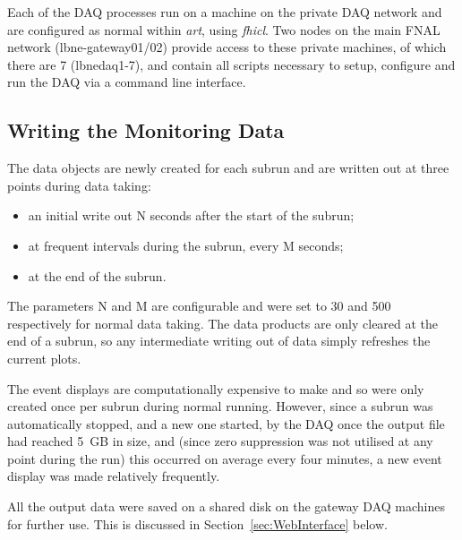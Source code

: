 Each of the DAQ processes run on a machine on the private DAQ network and are configured as normal within \textit{art}, using \textit{fhicl}.  Two nodes on the main FNAL network (lbne-gateway01/02) provide access to these private machines, of which there are 7 (lbnedaq1-7), and contain all scripts necessary to setup, configure and run the DAQ via a command line interface.

\subsection{Writing the Monitoring Data}\label{sec:WritingMonitoringData}

The data objects are newly created for each subrun and are written out at three points during data taking:
\begin{itemize}
\item an initial write out N seconds after the start of the subrun;
\item at frequent intervals during the subrun, every M seconds;
\item at the end of the subrun.
\end{itemize}
The parameters N and M are configurable and were set to 30 and 500 respectively for normal data taking.  The data products are only cleared at the end of a subrun, so any intermediate writing out of data simply refreshes the current plots.

The event displays are computationally expensive to make and so were only created once per subrun during normal running.  However, since a subrun was automatically stopped, and a new one started, by the DAQ once the output file had reached 5~GB in size, and (since zero suppression was not utilised at any point during the run) this occurred on average every four minutes, a new event display was made relatively frequently.

All the output data were saved on a shared disk on the gateway DAQ machines for further use.  This is discussed in Section~\ref{sec:WebInterface} below.


